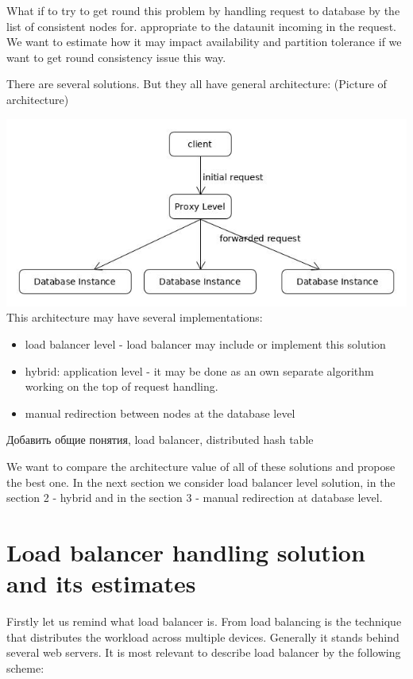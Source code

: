 \documentclass{report}
\begin{document}
What if to try to get round this problem by handling request to database by the list of consistent nodes for. appropriate to the dataunit incoming in the request.
We want to estimate how it may impact availability and partition tolerance if we want to 
get round consistency issue this way.

There are several solutions. But they all have general architecture:
(Picture of architecture)

\centering\includegraphics[scale=0.4]{images/abstract-database-arch.jpg}\hfill
This architecture may have several implementations:
\begin{itemize}
\item load balancer level - load balancer may include or implement this solution
\item hybrid: application level - it may be done as an own separate algorithm working on the top of request handling. 
\item manual redirection between nodes at the database level
\end{itemize}

Добавить общие понятия, load balancer, distributed hash table

We want to compare the architecture value of all of these solutions and propose the best one.
In the next section we consider load balancer level solution, in the section 2 - hybrid and in the section 3 - manual redirection at database level.

\chapter{Load balancer handling solution and its estimates}

Firstly let us remind what load balancer is.
From \cite{bib:brewer} load balancing is the technique that distributes the workload across multiple devices.
Generally it stands behind several web servers. It is most relevant to describe load balancer by the following scheme:
\end{document}

